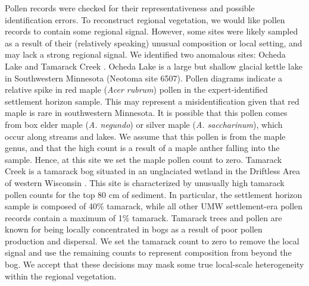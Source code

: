 \documentclass[12pt]{article}
\begin{document}
Pollen records were checked for their representativeness and possible
identification errors. To reconstruct regional vegetation, we would
like pollen records to contain some regional signal. However, some
sites were likely sampled as a result of their (relatively speaking)
unusual composition or local setting, and may lack a strong regional
signal. We identified two anomalous sites: Ocheda Lake and Tamarack
Creek . Ocheda Lake is a large but shallow glacial kettle lake in
Southwestern Minnesota (Neotoma site 6507). Pollen diagrams indicate a
relative spike in red maple (\textit{Acer rubrum}) pollen in the
expert-identified settlement horizon sample. This may represent a
misidentification given that red maple is rare in southwestern
Minnesota. It is possible that this pollen comes from box elder maple
(\textit{A. negundo}) or silver maple (\textit{A. saccharinum}), which
occur along streams and lakes. We assume that this pollen is from the
maple genus, and that the high count is a result of a maple anther
falling into the sample. Hence, at this site we set the maple pollen
count to zero. Tamarack Creek is a tamarack bog situated in an
unglaciated wetland in the Driftless Area of western Wisconsin
\citep{davis1979wetland}. This site is characterized by unusually high
tamarack pollen counts for the top 80 cm of sediment. In particular,
the settlement horizon sample is composed of 40\% tamarack, while all
other UMW settlement-era pollen records contain a maximum of 1\%
tamarack. Tamarack trees and pollen are known for being locally
concentrated in bogs as a result of poor pollen production and
dispersal. We set the tamarack count to zero to remove the local
signal and use the remaining counts to represent composition from
beyond the bog. We accept that these decisions may mask some true
local-scale heterogeneity within the regional vegetation.
\end{document}
